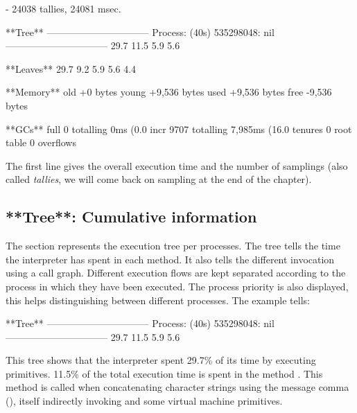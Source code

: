 \documentclass[a4paper,10pt,twoside]{book}
\begin{document}
\begin{code}

 - 24038 tallies, 24081 msec.

**Tree**
--------------------------------
Process: (40s)  535298048: nil
--------------------------------
29.7%
11.5%
  5.9%
  5.6%

**Leaves**
29.7%
9.2%
5.9%
5.6%
4.4%

**Memory**
	old			+0 bytes
	young		+9,536 bytes
	used		+9,536 bytes
	free		-9,536 bytes

**GCs**
	full			0 totalling 0ms (0.0%
	incr		9707 totalling 7,985ms (16.0%
	tenures		0
	root table	0 overflows
\end{code}

The first line gives the overall execution time and the number of samplings (also called \emph{tallies}, we will come back on sampling at the end of the chapter). 

\subsection{**Tree**: Cumulative information}

The  section represents the execution tree per processes. The tree tells the time the \pharo interpreter has spent in each method. It also tells  the different invocation using a call graph. Different execution flows are kept separated according to the process in which they have been executed. The process priority is also displayed, this helps distinguishing between different processes. The example tells:

\begin{code}

**Tree**
--------------------------------
Process: (40s)  535298048: nil
--------------------------------
29.7%
11.5%
  5.9%
  5.6%
\end{code}

This tree shows that the interpreter spent 29.7\% of its time by executing primitives. 11.5\% of the total execution time is spent in the method . This method is called when concatenating character strings using the message comma (\ct{,}), itself indirectly invoking  and some virtual machine primitives.
\end{document}
